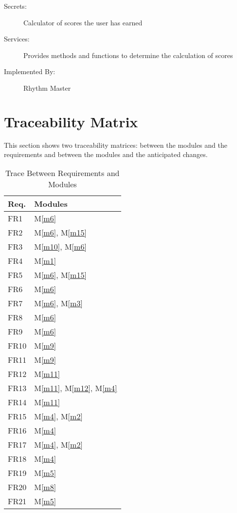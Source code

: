 \documentclass[12pt, titlepage]{article}
\newcommand{\mref}[1]{M\ref{#1}}
\begin{document}
\begin{description}
\item[Secrets:] Calculator of scores the user has earned 
\item[Services:] Provides methods and functions to determine the calculation of scores
\item[Implemented By:] Rhythm Master
\end{description}

\newpage
\section{Traceability Matrix} \label{SecTM}

This section shows two traceability matrices: between the modules and the
requirements and between the modules and the anticipated changes.

\begin{table}[H]
\centering
\begin{tabular}{p{} p{}}
\toprule
\textbf{Req.} & \textbf{Modules}\\
\midrule
FR1 & \mref{m6}\\
FR2 & \mref{m6}, \mref{m15}\\
FR3 & \mref{m10}, \mref{m6}\\
FR4 & \mref{m1}\\
FR5 & \mref{m6}, \mref{m15}\\
FR6 & \mref{m6}\\
FR7 & \mref{m6}, \mref{m3}\\
FR8 & \mref{m6}\\
FR9 & \mref{m6}\\
FR10 & \mref{m9}\\
FR11 & \mref{m9}\\
FR12 & \mref{m11}\\
FR13 & \mref{m11}, \mref{m12}, \mref{m4}\\
FR14 & \mref{m11}\\
FR15 & \mref{m4}, \mref{m2}\\
FR16 & \mref{m4}\\
FR17 & \mref{m4}, \mref{m2}\\
FR18 & \mref{m4}\\
FR19 & \mref{m5}\\
FR20 & \mref{m8}\\
FR21 & \mref{m5}\\
\bottomrule
\end{tabular}
\caption{Trace Between Requirements and Modules}
\label{TblRT}
\end{table}
\end{document}
